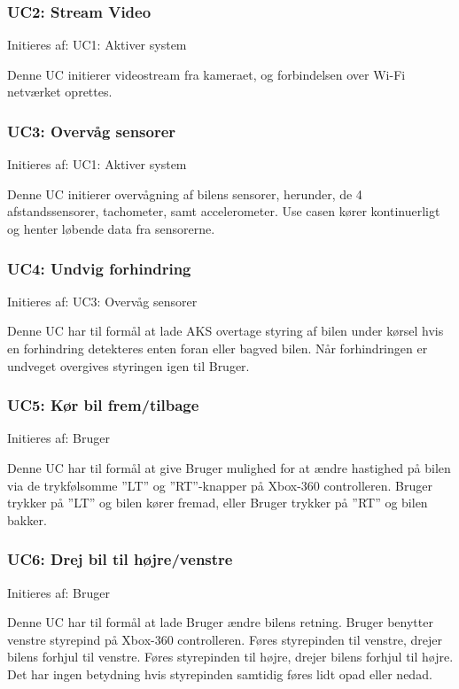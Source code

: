 \subsubsection{UC2: Stream Video}
Initieres af: UC1: Aktiver system

Denne UC initierer videostream fra kameraet, og forbindelsen over Wi-Fi netværket oprettes.

\subsubsection{UC3: Overvåg sensorer}
Initieres af: UC1: Aktiver system

Denne UC initierer overvågning af bilens sensorer, herunder, de 4 afstandssensorer, tachometer, samt accelerometer. Use casen kører kontinuerligt og henter løbende data fra sensorerne.

\subsubsection{UC4: Undvig forhindring}
Initieres af: UC3: Overvåg sensorer

Denne UC har til formål at lade AKS overtage styring af bilen under kørsel hvis en forhindring detekteres enten foran eller bagved bilen.
Når forhindringen er undveget overgives styringen igen til Bruger.

\subsubsection{UC5: Kør bil frem/tilbage}
Initieres af: Bruger

Denne UC har til formål at give Bruger mulighed for at ændre hastighed på bilen via  de trykfølsomme ''LT'' og ''RT''-knapper på Xbox-360 controlleren. Bruger trykker på ''LT'' og bilen kører fremad, eller Bruger trykker på ''RT'' og bilen bakker.

\subsubsection{UC6: Drej bil til højre/venstre}
Initieres af: Bruger

Denne UC har til formål at lade Bruger ændre bilens retning. Bruger benytter venstre styrepind på Xbox-360 controlleren. Føres styrepinden til venstre, drejer bilens forhjul til venstre. Føres styrepinden til højre, drejer bilens forhjul til højre. Det har ingen betydning hvis styrepinden samtidig føres lidt opad eller nedad.

